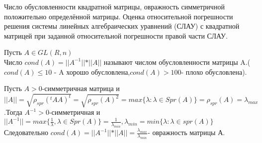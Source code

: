 \documentclass[__main__.tex]{subfiles}
\begin{document}
Число обусловленности квадратной матрицы, овражность симметричной положительно определённой матрицы. Оценка относительной погрешности решения системы линейных алгебраических уравнений (СЛАУ) с квадратной матрицей при заданной относительной погрешности правой части СЛАУ.

\begin{definition}
	Пусть $A\in GL(R,n)$\\
	Число $cond(A)=\vert\vert A^{-1} \vert\vert *\vert\vert A \vert\vert $ называют числом обусловленности матрицы A.($cond(A)\leq 10$ - A хорошо обусловлена,$cond(A)>100$- плохо обусловлена).
\end{definition}
	
\begin{definition}
	Пусть $A>0$-симметричная матрица и $\vert\vert A \vert\vert= \sqrt{\rho_{spr}(^tAA)^t}=\sqrt{\rho_{spr}(A)^2}=max\lbrace\lambda:\lambda\in Spr(A)\rbrace=\rho_{spr}(A)=\lambda_{max}$.Тогда $A^{-1}>0$-симметричная и $\vert\vert A^{-1} \vert\vert=max\lbrace\frac{1}{\lambda},\lambda \in Spr(A)\rbrace=\frac{1}{\lambda_{min}}, \lambda_{min}=min\lbrace\lambda:\lambda \in spr(A)\rbrace$\\
	Следовательно $cond(A)=\vert\vert A^{-1} \vert\vert *\vert\vert A \vert\vert=\frac{\lambda_{max}}{\lambda_{min}} $- овражность матрицы А.
\end{definition}
\end{document}
